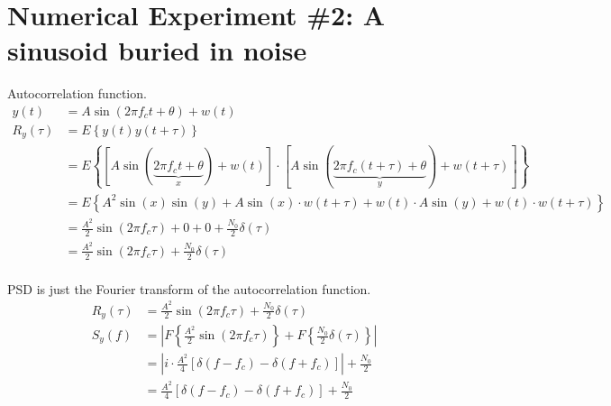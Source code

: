 \documentclass[12pt]{article}
\begin{document}

\section*{Numerical Experiment \#2: A sinusoid buried in noise}

Autocorrelation function.
\begin{equation*}
\begin{aligned}
        y(t) &= A\sin(2\pi f_ct + \theta) + w(t) \\
	R_y(\tau) &= E\left\{y(t)y(t+\tau)\right\} \\
        &= E\left \{\left[ A\sin(\underbrace{2 \pi f_c t + \theta}_{x}) + w(t) \right]\cdot \left[ A\sin(\underbrace{2 \pi f_c (t+\tau) + \theta}_{y}) + w(t+\tau) \right] \right \} \\
        &= E\left \{A^2\sin(x)\sin(y) + A\sin(x)\cdot w(t+\tau) + w(t)\cdot A\sin(y) + w(t)\cdot w(t+\tau)\right \} \\
        &= \frac{A^2}{2}\sin(2\pi f_c \tau) + 0 + 0 + \frac{N_0}{2}\delta(\tau) \\
        &= \frac{A^2}{2} \sin(2\pi f_c \tau) + \frac{N_0}{2}\delta(\tau) \\
\end{aligned}
\end{equation*}

PSD is just the Fourier transform of the autocorrelation function.
\begin{equation*}
\begin{aligned}
	R_y(\tau) &= \frac{A^2}{2} \sin(2\pi f_c \tau) + \frac{N_0}{2}\delta(\tau) \\
        S_y(f) &= \left |F\left \{\frac{A^2}{2} \sin(2\pi f_c \tau) \right \} + F\left \{\frac{N_0}{2}\delta(\tau) \right \}\right | \\
        &= \left | i \cdot \frac{A^2}{4} \left [\delta(f - f_c) - \delta(f + f_c)\right ]\right | + \frac{N_0}{2} \\
        &= \frac{A^2}{4} \left [\delta(f - f_c) - \delta(f + f_c)\right ] + \frac{N_0}{2}
\end{aligned}
\end{equation*}
\end{document}
